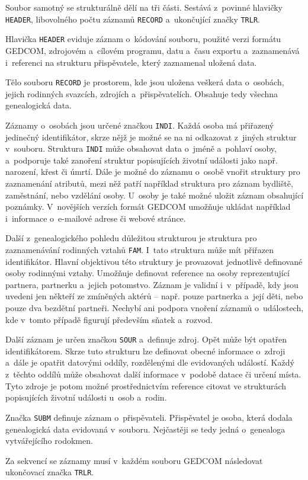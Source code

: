 		Soubor samotný se strukturálně dělí na tři části. Sestává z~povinné hlavičky \texttt{HEADER}, libovolného počtu záznamů \texttt{RECORD} a~ukončující značky \texttt{TRLR}. \par
		Hlavička \texttt{HEADER} eviduje záznam o~kódování souboru, použité verzi formátu GEDCOM, zdrojovém a~cílovém programu, datu a~času exportu a~zaznamenává i~referenci na strukturu přispěvatele, který zaznamenal uložená data. \par
		Tělo souboru \texttt{RECORD} je prostorem, kde jsou uložena veškerá data o~osobách, jejich rodinných svazcích, zdrojích a~přispěvatelích. Obsahuje tedy všechna genealogická data. \par
		Záznamy o~osobách jsou určené značkou \texttt{INDI}. Každá osoba má přiřazený jedinečný identifikátor, skrze nějž je možné se na ni odkazovat z~jiných struktur v~souboru. Struktura \texttt{INDI} může obsahovat data o~jméně a~pohlaví osoby, a~podporuje také zanoření struktur popisujících životní události jako např. narození, křest či úmrtí. Dále je možné do záznamu o~osobě vnořit struktury pro zaznamenání atributů, mezi něž patří například struktura pro záznam bydliště, zaměstnání, nebo vzdělání osoby. U~osoby je také možné uložit záznam obsahující poznámky. V~novějších verzích formát GEDCOM umožňuje ukládat například i~informace o~e-mailové adrese či webové stránce. \par
		Další z~genealogického pohledu důležitou strukturou je struktura pro zaznamenávání rodinných vztahů \texttt{FAM}. I~tato struktura může mít přiřazen identifikátor. Hlavní objektivou této struktury je provazovat jednotlivě definované osoby rodinnými vztahy. Umožňuje definovat reference na osoby reprezentující partnera, partnerku a~jejich potomstvo. Záznam je validní i~v~případě, kdy jsou uvedeni jen někteří ze zmíněných aktérů -- např. pouze partnerka a~její děti, nebo pouze dva bezdětní partneři. Nechybí ani podpora vnoření záznamů o~událostech, kde v~tomto případě figurují především sňatek a~rozvod. \par
		Další záznam je určen značkou \texttt{SOUR} a~definuje zdroj. Opět může být opatřen identifikátorem. Skrze tuto strukturu lze definovat obecné informace o~zdroji a~dále je opatřit datovými oddíly, rozdělenými dle evidovaných událostí. Každý z~těchto oddílů může obsahovat další informace v~podobě datace či určení místa. Tyto zdroje je potom možné prostřednictvím reference citovat ve strukturách popisujících životní události u~osob a~rodin.\par
		Značka \texttt{SUBM} definuje záznam o~přispěvateli. Přispěvatel je osoba, která dodala genealogická data evidovaná v~souboru. Nejčastěji se tedy jedná o~genealoga vytvářejícího rodokmen. \par
		Za sekvencí se záznamy musí v~každém souboru GEDCOM následovat ukončovací značka \texttt{TRLR}. 
		
